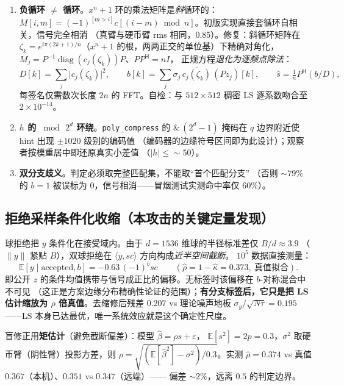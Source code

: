 \documentclass[UTF8,11pt,a4paper]{ctexart}
\newcommand{\code}[1]{\texttt{\small #1}}
\begin{document}
\begin{enumerate}
\item \textbf{负循环 $\neq$ 循环}。$x^n{+}1$ 环的乘法矩阵是\emph{斜}循环的：
$M[i,m]=(-1)^{[m>i]}c[(i-m)\bmod n]$。初版实现直接套循环自相关，信号完全相消
（真臂与硬币臂 rms 相同，0.85）。修复：斜循环矩阵在
$\zeta_k=e^{i\pi(2k+1)/n}$（$x^n{+}1$ 的根，两两正交的单位基）下精确对角化，
$M_j=P^{-1}\operatorname{diag}(c_j(\zeta_k))P$、$PP^{\mathsf H}=nI$，
正规方程\emph{退化为逐频点除法}：
\begin{equation*}
D[k]=\sum_j\bigl|c_j(\zeta_k)\bigr|^2,\qquad
b[k]=\sum_j\sigma_j\,\overline{c_j(\zeta_k)}\,(Pz_j)[k],\qquad
\hat s=\tfrac1n P^{\mathsf H}(b/D),
\end{equation*}
每签名仅需数次长度 $2n$ 的 FFT。自检：与 $512\times512$ 稠密 LS 逐系数吻合至
$2\times10^{-14}$。
\item \textbf{$h$ 的 $\bmod\,2^d$ 环绕}。\code{poly\_compress} 的
$\&\,(2^d{-}1)$ 掩码在 $q$ 边界附近使 hint 出现 $\pm1020$ 级别的编码值
（编码器的边缘符号区间即为此设计）；观察者按模重居中即还原真实小差值
（$|h|\le\sim 50$）。
\item \textbf{双分支歧义}。判定必须取完整匹配集，不能取``首个匹配分支''
（否则 $\sim 79\%$ 的 $b{=}1$ 被误标为 0，信号相消——冒烟测试实测命中率仅 $60\%$）。
\end{enumerate}

\subsection{拒绝采样条件化收缩（本攻击的关键定量发现）}

球拒绝把 $y$ 条件化在接受域内。由于 $d{=}1536$ 维球的半径标准差仅 $B/d\approx3.9$
（$\|y\|$ 紧贴 $B$），双球拒绝在 $\langle y,sc\rangle$ 方向构成\emph{近半空间截断}。
$10^5$ 数据直接测量：
\begin{equation*}
\mathbb E[y\mid\text{accepted},b]=-0.63\,(-1)^b s c
\qquad(\hat\rho=1-\hat\kappa=0.373,\ \text{真值拟合}).
\end{equation*}
即公开 $z$ 的条件均值携带与信号成正比的偏移。无标签时该偏移在 $b$-对称混合中不可见
（这正是方案边缘分布精确性论证的范围）；\textbf{有分支标签后，它只是把 LS 估计缩放为
$\rho$ 倍真值}。去缩修后残差 $0.207$ vs 理论噪声地板
$\sigma_y/\sqrt{N\tau}=0.195$——LS 本身已达最优，唯一系统效应就是这个确定性尺度。

盲修正用\textbf{矩估计}（避免截断偏差）：模型 $\hat\beta=\rho s+\varepsilon$，
$\mathbb E[s^2]=2p=0.3$，$\sigma^2$ 取硬币臂（阴性臂）投影方差，则
$\rho=\sqrt{(\mathbb E[\hat\beta^2]-\sigma^2)/0.3}$。实测
$\hat\rho=0.374$ vs 真值 $0.367$（本机）、$0.351$ vs $0.347$（远端）——
偏差 $\sim 2\%$，远离 $0.5$ 的判定边界。
\end{document}

